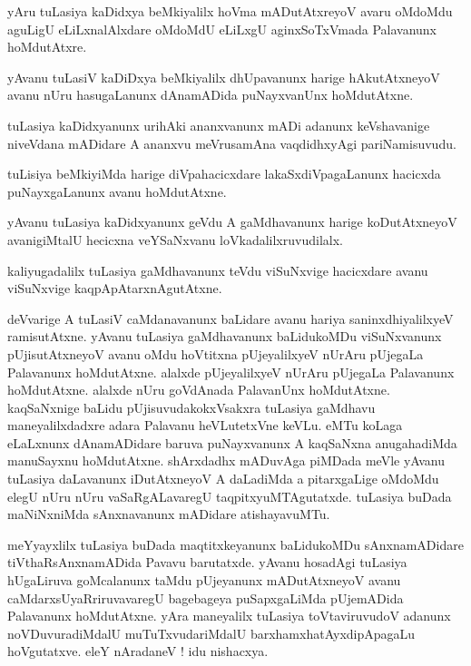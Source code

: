 \documentclass{article}
\begin{document}
\begin{mn}%
yAru tuLasiya kaDidxya beMkiyalilx hoVma mADutAtxreyoV avaru oMdoMdu aguLigU eLiLxnalAlxdare 
oMdoMdU eLiLxgU aginxSoTxVmada Palavanunx hoMdutAtxre.
\end{mn}

\begin{mn}%
yAvanu tuLasiV kaDiDxya beMkiyalilx dhUpavanunx harige hAkutAtxneyoV avanu nUru hasugaLanunx 
dAnamADida puNayxvanUnx hoMdutAtxne.
\end{mn}

\begin{mn}%
tuLasiya kaDidxyanunx urihAki ananxvanunx mADi adanunx keVshavanige niveVdana mADidare A 
ananxvu meVrusamAna vaqdidhxyAgi pariNamisuvudu.
\end{mn}

\begin{mn}%
tuLisiya beMkiyiMda harige diVpahacicxdare lakaSxdiVpagaLanunx hacicxda puNayxgaLanunx avanu 
hoMdutAtxne.
\end{mn}

\begin{mn}%
yAvanu tuLasiya kaDidxyanunx geVdu A gaMdhavanunx harige koDutAtxneyoV avanigiMtalU hecicxna 
veYSaNxvanu loVkadalilxruvudilalx. 
\end{mn}

\begin{mn}%
kaliyugadalilx tuLasiya gaMdhavanunx teVdu viSuNxvige hacicxdare avanu viSuNxvige 
kaqpApAtarxnAgutAtxne.
\end{mn}

\begin{mn}%
deVvarige A tuLasiV caMdanavanunx baLidare avanu hariya saninxdhiyalilxyeV ramisutAtxne. 
yAvanu tuLasiya gaMdhavanunx baLidukoMDu viSuNxvanunx pUjisutAtxneyoV avanu oMdu hoVtitxna 
pUjeyalilxyeV nUrAru pUjegaLa Palavanunx hoMdutAtxne. alalxde pUjeyalilxyeV nUrAru pUjegaLa 
Palavanunx hoMdutAtxne. alalxde nUru goVdAnada PalavanUnx hoMdutAtxne. kaqSaNxnige baLidu 
pUjisuvudakokxVsakxra tuLasiya gaMdhavu maneyalilxdadxre adara Palavanu heVLutetxVne keVLu. 
eMTu koLaga eLaLxnunx dAnamADidare baruva puNayxvanunx A kaqSaNxna anugahadiMda manuSayxnu 
hoMdutAtxne. shArxdadhx mADuvAga piMDada meVle yAvanu tuLasiya daLavanunx iDutAtxneyoV A 
daLadiMda  a pitarxgaLige oMdoMdu elegU nUru nUru vaSaRgALavaregU taqpitxyuMTAgutatxde. 
tuLasiya buDada maNiNxniMda sAnxnavanunx mADidare atishayavuMTu.
\end{mn}

\begin{mn}%
meYyayxlilx tuLasiya buDada maqtitxkeyanunx baLidukoMDu sAnxnamADidare tiVthaRsAnxnamADida 
Pavavu barutatxde. yAvanu hosadAgi tuLasiya hUgaLiruva goMcalanunx taMdu pUjeyanunx 
mADutAtxneyoV avanu caMdarxsUyaRriruvavaregU bagebageya puSapxgaLiMda pUjemADida Palavanunx 
hoMdutAtxne. yAra maneyalilx tuLasiya toVtaviruvudoV adanunx noVDuvuradiMdalU 
muTuTxvudariMdalU barxhamxhatAyxdipApagaLu hoVgutatxve. eleY nAradaneV ! idu nishacxya.
\end{mn}
\end{document}
